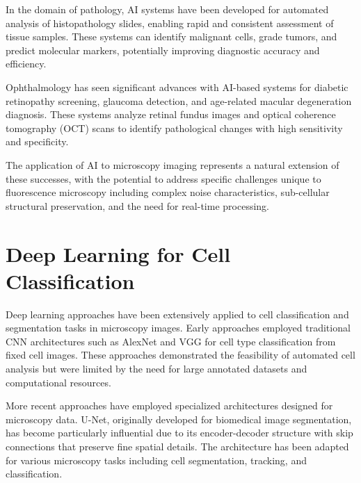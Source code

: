\documentclass[12pt,a4paper]{report}
\begin{document}
\vspace{0.5cm}

In the domain of pathology, AI systems have been developed for automated analysis of histopathology slides, enabling rapid and consistent assessment of tissue samples. These systems can identify malignant cells, grade tumors, and predict molecular markers, potentially improving diagnostic accuracy and efficiency.

\vspace{0.5cm}

Ophthalmology has seen significant advances with AI-based systems for diabetic retinopathy screening, glaucoma detection, and age-related macular degeneration diagnosis. These systems analyze retinal fundus images and optical coherence tomography (OCT) scans to identify pathological changes with high sensitivity and specificity.

\vspace{0.5cm}

The application of AI to microscopy imaging represents a natural extension of these successes, with the potential to address specific challenges unique to fluorescence microscopy including complex noise characteristics, sub-cellular structural preservation, and the need for real-time processing.

\section{Deep Learning for Cell Classification}

Deep learning approaches have been extensively applied to cell classification and segmentation tasks in microscopy images. Early approaches employed traditional CNN architectures such as AlexNet and VGG for cell type classification from fixed cell images. These approaches demonstrated the feasibility of automated cell analysis but were limited by the need for large annotated datasets and computational resources.

\vspace{0.5cm}

More recent approaches have employed specialized architectures designed for microscopy data. U-Net, originally developed for biomedical image segmentation, has become particularly influential due to its encoder-decoder structure with skip connections that preserve fine spatial details. The architecture has been adapted for various microscopy tasks including cell segmentation, tracking, and classification.
\end{document}
